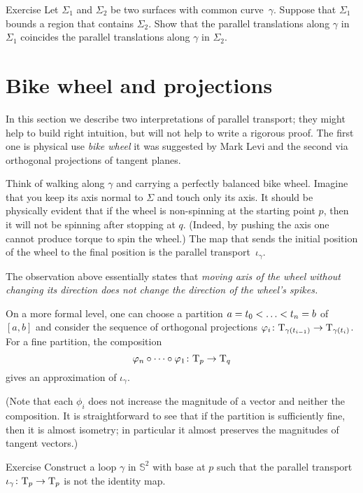 \begin{thm}{Exercise}\label{ex:parallel-transport-support}
Let $\Sigma_1$ and $\Sigma_2$ be two surfaces with common curve~$\gamma$.
Suppose that $\Sigma_1$ bounds a region that contains $\Sigma_2$.
Show that the parallel translations along $\gamma$ in $\Sigma_1$ 
coincides the parallel translations along $\gamma$ in $\Sigma_2$. 
\end{thm}

\section{Bike wheel and projections}

In this section we describe two interpretations of parallel transport;
they might help to build right intuition, but will not help to write a rigorous proof.
The first one is physical use \emph{bike wheel} it was suggested by Mark Levi \cite{levi} and the second via orthogonal projections of tangent planes.

Think of walking along $\gamma$ and carrying a perfectly balanced bike wheel.
Imagine that you keep its axis normal to $\Sigma$ and touch only its axis.
It should be physically evident that if the wheel is non-spinning at the starting point $p$, then it will not be spinning after stopping at $q$.
(Indeed, by pushing the axis one cannot produce torque to spin the wheel.)
The map that sends the initial position of the wheel to the final position is  the parallel transport~$\iota_\gamma$.

The observation above essentially states that {}\emph{moving axis of the wheel without changing its direction does not change the direction of the wheel's spikes.}

On a more formal level, one can choose a partition $a=t_0<\dots\z<t_n=b$ of $[a,b]$
and consider the sequence of orthogonal projections $\varphi_i\colon\mathrm{T}_{\gamma(t_{i-1})}\to\mathrm{T}_{\gamma(t_i)}$.
For a fine partition, the composition 
\[\phi_n\circ\dots\circ\phi_1\:\T_p\z\to\T_q\]
gives an approximation of $\iota_\gamma$.

(Note that each $\phi_i$ does not increase the magnitude of a vector and neither the composition.
It is straightforward to see that if the partition is sufficiently fine, then it is almost isometry; in particular it almost preserves the magnitudes of tangent vectors.)

\begin{thm}{Exercise}\label{ex:holonomy=not0}
Construct a loop $\gamma$ in $\mathbb{S}^2$ with base at $p$ such that the parallel transport $\iota_\gamma\colon\mathrm{T}_p\to\mathrm{T}_p$ is not the identity map.
\end{thm}

